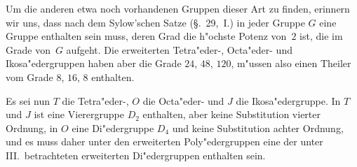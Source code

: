 \documentclass[12pt,a4paper]{article}
\theoremstyle{plain}
\theoremstyle{definition}
\theoremstyle{remark}
\begin{document}
Um die anderen etwa noch vorhandenen Gruppen dieser Art zu finden, erinnern wir uns, dass nach dem Sylow'schen Satze (\S.~29,~I.) in jeder Gruppe $G$ eine Gruppe enthalten sein muss, deren Grad die h"ochste Potenz von~$2$ ist, die im Grade von~$G$ aufgeht. Die erweiterten Tetra"eder-, Octa"eder- und Ikosa"edergruppen haben aber die Grade $24$, $48$, $120$, m"ussen also einen Theiler vom Grade $8$, $16$, $8$ enthalten.

Es sei nun $T$ die Tetra"eder-, $O$ die Octa"eder- und $J$ die Ikosa"edergruppe. In $T$ und $J$ ist eine Vierergruppe $D_{2}$ enthalten, aber keine Substitution vierter Ordnung, in $O$ eine Di"edergruppe $D_{4}$ und keine Substitution achter Ordnung, und es muss daher unter den erweiterten Poly"edergruppen eine der unter III.\ betrachteten erweiterten Di"edergruppen enthalten sein.
\end{document}
